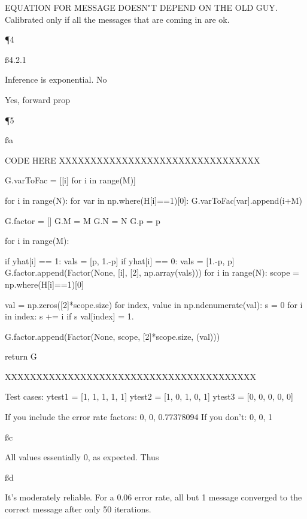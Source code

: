 EQUATION FOR MESSAGE DOESN"T DEPEND ON THE OLD GUY. Calibrated only if all the messages that are coming in are ok.

\P 4

\ss{4.2.1}

Inference is exponential. 
No

Yes, forward prop

\P 5

\ss a

CODE HERE XXXXXXXXXXXXXXXXXXXXXXXXXXXXXXXX

    G.varToFac = [[i] for i in range(M)]

    for i in range(N):
        for var in np.where(H[i]==1)[0]:
            G.varToFac[var].append(i+M)

    G.factor = []
    G.M = M
    G.N = N
    G.p = p

    for i in range(M):

        if yhat[i] == 1:
            vals = [p, 1.-p]
        if yhat[i] == 0:
            vals = [1.-p, p]
        G.factor.append(Factor(None, [i], [2], np.array(vals)))
    for i in range(N):
        scope = np.where(H[i]==1)[0]

        val = np.zeros([2]*scope.size)
        for index, value in np.ndenumerate(val):
            s = 0
            for i in index:
                s += i
            if s%
                val[index] = 1.

        G.factor.append(Factor(None, scope, [2]*scope.size, (val)))

    return G
    
XXXXXXXXXXXXXXXXXXXXXXXXXXXXXXXXXXXXXXXX

Test cases:
ytest1 = [1, 1, 1, 1, 1]
ytest2 = [1, 0, 1, 0, 1]
ytest3 = [0, 0, 0, 0, 0]

If you include the error rate factors:
0, 0, 0.77378094
If you don't: 
0, 0, 1

\ss c

All values essentially 0, as expected. Thus


\ss d

It's moderately reliable. For a 0.06 error rate, all but 1 message converged to the correct message after only 50 iterations.


